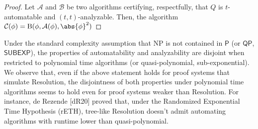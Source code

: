    \begin{proof}
        Let $\mathcal{A}$ and $\mathcal{B}$ be two algorithms certifying, respectfully, that $Q$ is $t$-automatable and $(t,t)$-analyzable. Then, the algorithm $\mathcal{C}(\phi) = \mathrm{B}(\phi, \mathcal{A}(\phi), \abs{\phi}^2)$
    \end{proof}

    Under the standard complexity assumption that $\mathrm{NP}$ is not contained in $\mathsf{P}$ (or $\mathsf{QP}$, $\mathsf{SUBEXP}$), the properties of automatability and analyzability are disjoint when restricted to polynomial time algorithms (or quasi-polynomial, sub-exponential). We observe that, even if the above statement holds for proof systems that simulate Resolution, the disjointness of both properties under polynomial time algorithms seems to hold even for proof systems weaker than Resolution. For instance, de Rezende [dR20] proved that, under the Randomized Exponential Time Hypothesis (rETH), tree-like Resolution doesn't admit automating algorithms with runtime lower than quasi-polynomial.

\cleardoublepage